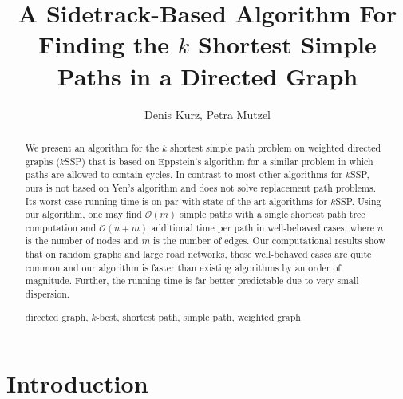 \documentclass[runningheads,a4paper]{llncs}
\title{A Sidetrack-Based Algorithm For Finding the $k$ Shortest Simple Paths in a Directed Graph}
\author{Denis Kurz, Petra Mutzel}
\institute{Department of Computer Science, TU Dortmund, Germany\\
\email{\{denis.kurz,petra.mutzel\}@tu-dortmund.de}}
\newcommand{\keywords}[1]{\par\addvspace\baselineskip
\noindent\keywordname\enspace\ignorespaces#1}
\begin{document}
\def\sectionautorefname{Section}
\def\figureautorefname{Figure}
\def\tableautorefname{Table}
\def\theoremautorefname{Theorem}

\mainmatter
\maketitle

\begin{abstract}
We present an algorithm for the $k$ shortest simple path problem on weighted directed graphs ($k$SSP) that is based on Eppstein's algorithm for a similar problem in which paths are allowed to contain cycles.
In contrast to most other algorithms for $k$SSP, ours is not based on Yen's algorithm \cite{CUSTOM:journals/networks/Yen71} and does not solve replacement path problems.
Its worst-case running time is on par with state-of-the-art algorithms for $k$SSP.
Using our algorithm, one may find $\mathcal O(m)$ simple paths with a single shortest path tree computation and $\mathcal O(n + m)$ additional time per path in well-behaved cases, where $n$ is the number of nodes and $m$ is the number of edges.
Our computational results show that on random graphs and large road networks, these well-behaved cases are quite common and our algorithm is faster than existing algorithms by an order of magnitude.
Further, the running time is far better predictable due to very small dispersion.
\keywords{directed graph, $k$-best, shortest path, simple path, weighted graph}
\end{abstract}


\section{Introduction}
\label{sec:introduction}
\end{document}
